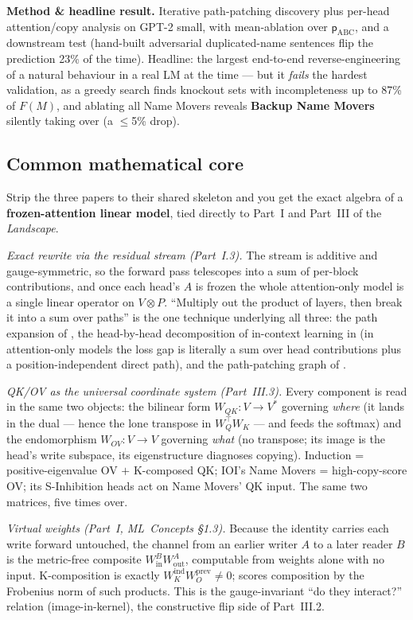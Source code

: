 \textbf{Method \& headline result.} Iterative path-patching discovery plus per-head attention/copy analysis on GPT-2 small, with mean-ablation over $\mathsf{p}_{\mathrm{ABC}}$, and a downstream test (hand-built adversarial duplicated-name sentences flip the prediction 23\% of the time). Headline: the largest end-to-end reverse-engineering of a natural behaviour in a real LM at the time --- but it \emph{fails} the hardest validation, as a greedy search finds knockout sets with incompleteness up to 87\% of $F(M)$, and ablating all Name Movers reveals \textbf{Backup Name Movers} silently taking over (a $\le$5\% drop).

\subsection*{Common mathematical core}

Strip the three papers to their shared skeleton and you get the exact algebra of a \textbf{frozen-attention linear model}, tied directly to Part~I and Part~III of the \emph{Landscape}.

\emph{Exact rewrite via the residual stream (Part~I.3).} The stream is additive and gauge-symmetric, so the forward pass telescopes into a sum of per-block contributions, and once each head's $A$ is frozen the whole attention-only model is a single linear operator on $V\otimes P$. ``Multiply out the product of layers, then break it into a sum over paths'' is the one technique underlying all three: the path expansion of \textcite{framework}, the head-by-head decomposition of in-context learning in \textcite{induction-heads} (in attention-only models the loss gap is literally a sum over head contributions plus a position-independent direct path), and the path-patching graph of \textcite{interpretability-in-the-wild-ioi}.

\emph{QK/OV as the universal coordinate system (Part~III.3).} Every component is read in the same two objects: the bilinear form $W_{QK}:V\to V^{*}$ governing \emph{where} (it lands in the dual --- hence the lone transpose in $W_Q^{\top}W_K$ --- and feeds the softmax) and the endomorphism $W_{OV}:V\to V$ governing \emph{what} (no transpose; its image is the head's write subspace, its eigenstructure diagnoses copying). Induction = positive-eigenvalue OV $+$ K-composed QK; IOI's Name Movers = high-copy-score OV; its S-Inhibition heads act on Name Movers' QK input. The same two matrices, five times over.

\emph{Virtual weights (Part~I, \emph{ML~Concepts} \S1.3).} Because the identity carries each write forward untouched, the channel from an earlier writer $A$ to a later reader $B$ is the metric-free composite $W_{\mathrm{in}}^{B}W_{\mathrm{out}}^{A}$, computable from weights alone with no input. K-composition is exactly $W_K^{\mathrm{ind}}W_O^{\mathrm{prev}}\neq 0$; \textcite{framework} scores composition by the Frobenius norm of such products. This is the gauge-invariant ``do they interact?'' relation (image-in-kernel), the constructive flip side of Part~III.2.

